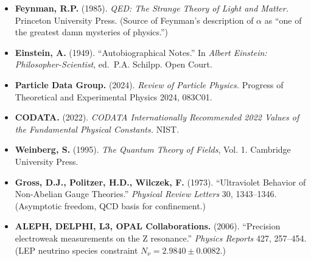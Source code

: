 \documentclass[
  11pt,
  letterpaper,
]{article}
\begin{document}
\begin{itemize}
\item
  \textbf{Feynman, R.P.} (1985). \emph{QED: The Strange Theory of Light
  and Matter.} Princeton University Press. (Source of Feynman's
  description of \(\alpha\) as ``one of the greatest damn mysteries of
  physics.'')
\item
  \textbf{Einstein, A.} (1949). ``Autobiographical Notes.'' In
  \emph{Albert Einstein: Philosopher-Scientist}, ed.~P.A. Schilpp. Open
  Court.
\item
  \textbf{Particle Data Group.} (2024). \emph{Review of Particle
  Physics.} Progress of Theoretical and Experimental Physics 2024,
  083C01.
\item
  \textbf{CODATA.} (2022). \emph{CODATA Internationally Recommended 2022
  Values of the Fundamental Physical Constants.} NIST.
\item
  \textbf{Weinberg, S.} (1995). \emph{The Quantum Theory of Fields},
  Vol. 1. Cambridge University Press.
\item
  \textbf{Gross, D.J., Politzer, H.D., Wilczek, F.} (1973).
  ``Ultraviolet Behavior of Non-Abelian Gauge Theories.'' \emph{Physical
  Review Letters} 30, 1343--1346. (Asymptotic freedom, QCD basis for
  confinement.)
\item
  \textbf{ALEPH, DELPHI, L3, OPAL Collaborations.} (2006). ``Precision
  electroweak measurements on the Z resonance.'' \emph{Physics Reports}
  427, 257--454. (LEP neutrino species constraint
  \(N_\nu = 2.9840 \pm 0.0082\).)
\end{itemize}
\end{document}
